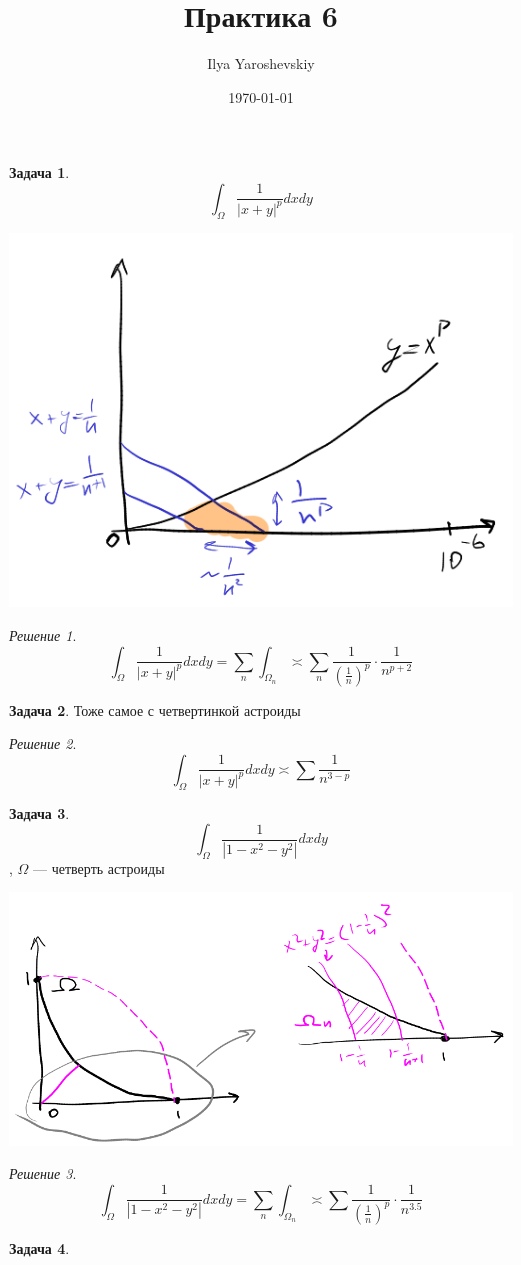 \documentclass[english]{article}
\author{Ilya Yaroshevskiy}
\date{\today}
\title{Практика 6}
\theoremstyle{plain}
\theoremstyle{remark}
\newtheorem*{solution}{Решение}
\theoremstyle{definition}
\newtheorem{task}{Задача}
\begin{document}
\maketitle
\tableofcontents

\begin{task}
\[ \int_\Omega \frac{1}{|x + y|^p} dx dy \]
\begin{center}
\includegraphics[scale=0.5]{6_1.png}
\end{center}
\end{task}
\begin{solution}
\[ \int_\Omega \frac{1}{|x + y|^p} dx dy = \sum_n \int_{\Omega_n} \asymp \sum_n \frac{1}{\left(\frac{1}{n}\right)^p}\cdot \frac{1}{n^{p + 2}} \]
\end{solution}
\begin{task}
Тоже самое с четвертинкой астроиды
\end{task}
\begin{solution}
\[ \int_\Omega \frac{1}{|x + y|^p} dx dy \asymp \sum \frac{1}{n^{3 - p}} \]
\end{solution}
\begin{task}
\[ \int_\Omega \frac{1}{|1 - x^2 - y^2|} dx dy \],
\(\Omega\) --- четверть астроиды
\begin{center}
\includegraphics[scale=0.5]{6_2.png}
\end{center}
\end{task}
\begin{solution}
\[ \int_\Omega \frac{1}{|1 - x^2 - y^2|} dx dy = \sum_n \int_{\Omega_n} \asymp \sum \frac{1}{\left(\frac{1}{n}\right)^p}\cdot\frac{1}{n^{3.5}} \]
\end{solution}
\begin{task}
\end{task}
\end{document}
